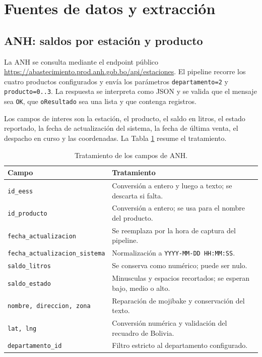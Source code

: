 \documentclass[12pt,a4paper]{article}
\begin{document}
\section{Fuentes de datos y extracción}\label{sec:fuentes}

\subsection{ANH: saldos por estación y producto}

La ANH se consulta mediante el endpoint público \url{https://abastecimiento.prod.anh.gob.bo/api/estaciones}. El pipeline recorre los cuatro productos configurados y envía los parámetros \texttt{departamento=2} y \texttt{producto=0..3}. La respuesta se interpreta como JSON y se valida que el mensaje sea \texttt{OK}, que \texttt{oResultado} sea una lista y que contenga registros.

Los campos de interes son la estación, el producto, el saldo en litros, el estado reportado, la fecha de actualización del sistema, la fecha de última venta, el despacho en curso y las coordenadas. La Tabla \ref{tab:anh-campos} resume el tratamiento.

\begin{table}[H]
\centering
\small
\caption{Tratamiento de los campos de ANH.}
\label{tab:anh-campos}
\begin{tabularx}{\linewidth}{@{}l X@{}}
\toprule
\textbf{Campo} & \textbf{Tratamiento} \\
\midrule
\texttt{id\_eess} & Conversión a entero y luego a texto; se descarta si falta. \\
\texttt{id\_producto} & Conversión a entero; se usa para el nombre del producto. \\
\texttt{fecha\_actualizacion} & Se reemplaza por la hora de captura del pipeline. \\
\texttt{fecha\_actualizacion\_sistema} & Normalización a \texttt{YYYY-MM-DD HH:MM:SS}. \\
\texttt{saldo\_litros} & Se conserva como numérico; puede ser nulo. \\
\texttt{saldo\_estado} & Minusculas y espacios recortados; se esperan bajo, medio o alto. \\
\texttt{nombre, direccion, zona} & Reparación de mojibake y conservación del texto. \\
\texttt{lat, lng} & Conversión numérica y validación del recuadro de Bolivia. \\
\texttt{departamento\_id} & Filtro estricto al departamento configurado. \\
\bottomrule
\end{tabularx}
\end{table}
\end{document}

